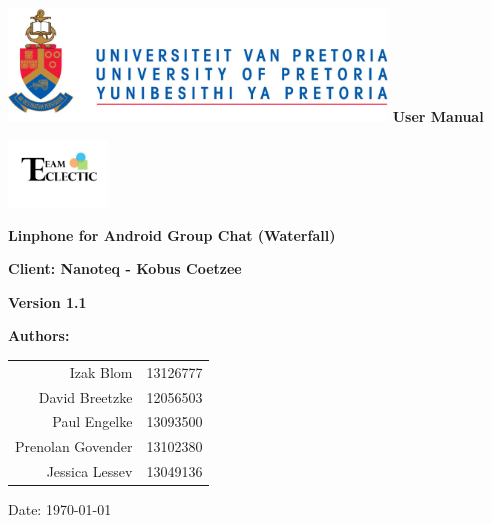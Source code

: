 \begin{titlepage}
\begin{flushright}

\includegraphics[width=380px]{../global/University_of_Pretoria_Logo.png}
\newline
\newline
\textbf {\LARGE User Manual} \newline


\centering\includegraphics[width=100px]{../global/Logo.jpg}


\textbf {\Large Linphone for Android Group Chat (Waterfall)}\newline

\textbf {\Large Client: Nanoteq - Kobus Coetzee}\newline

\textbf {\large Version 1.1}\newline

\centering \textbf {\large Authors:}

\begin{table}[H]
\large
\centering
\begin{tabular}{rl}
	Izak Blom & 13126777 \\
	David Breetzke & 12056503 \\
	Paul Engelke & 13093500 \\
	Prenolan Govender & 13102380 \\
	Jessica Lessev & 13049136 \\
\end{tabular}
\end{table}

Date: \today

\end{flushright}
\end{titlepage}